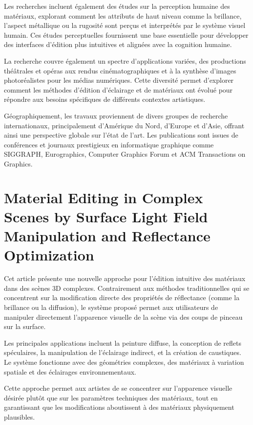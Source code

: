 \documentclass{article}
\begin{document}
Les recherches incluent également des études sur la perception humaine des matériaux, explorant comment les attributs de haut niveau comme la brillance, l'aspect métallique ou la rugosité sont perçus et interprétés par le système visuel humain. Ces études perceptuelles fournissent une base essentielle pour développer des interfaces d'édition plus intuitives et alignées avec la cognition humaine.

La recherche couvre également un spectre d'applications variées, des productions théâtrales et opéras aux rendus cinématographiques et à la synthèse d'images photoréalistes pour les médias numériques. Cette diversité permet d'explorer comment les méthodes d'édition d'éclairage et de matériaux ont évolué pour répondre aux besoins spécifiques de différents contextes artistiques.

Géographiquement, les travaux proviennent de divers groupes de recherche internationaux, principalement d'Amérique du Nord, d'Europe et d'Asie, offrant ainsi une perspective globale sur l'état de l'art. Les publications sont issues de conférences et journaux prestigieux en informatique graphique comme SIGGRAPH, Eurographics, Computer Graphics Forum et ACM Transactions on Graphics.
\newpage
\section{Material Editing in Complex Scenes by Surface Light Field Manipulation and Reflectance Optimization}

Cet article présente une nouvelle approche pour l'édition intuitive des matériaux dans des scènes 3D complexes. Contrairement aux méthodes traditionnelles qui se concentrent sur la modification directe des propriétés de réflectance (comme la brillance ou la diffusion), le système proposé permet aux utilisateurs de manipuler directement l'apparence visuelle de la scène via des coups de pinceau sur la surface.

Les principales applications incluent la peinture diffuse, la conception de reflets spéculaires, la manipulation de l'éclairage indirect, et la création de caustiques. Le système fonctionne avec des géométries complexes, des matériaux à variation spatiale et des éclairages environnementaux.

Cette approche permet aux artistes de se concentrer sur l'apparence visuelle désirée plutôt que sur les paramètres techniques des matériaux, tout en garantissant que les modifications aboutissent à des matériaux physiquement plausibles.
\end{document}
